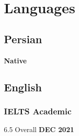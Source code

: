 \documentclass[a4paper]{article}
\begin{document}
\section{Languages}
    
\begin{multicols}{2}
	\subsection{Persian}
	\paragraph{\bfseries Native}
	\vfill\null
	\columnbreak
	\subsection{English}
	\subsubsection{IELTS Academic}
	{6.5 Overall}
	\hfill
	{\bfseries DEC 2021}
\end{multicols}
\end{document}
